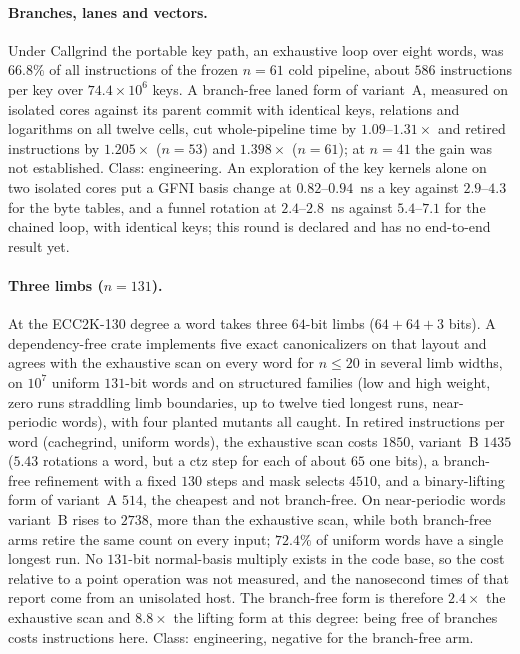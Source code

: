 \paragraph{Branches, lanes and vectors.}
Under Callgrind the portable key path, an exhaustive loop over eight
words, was $66.8\%$ of all instructions of the frozen $n=61$ cold
pipeline, about $586$ instructions per key over $74.4\times10^6$ keys.
A branch-free laned form of variant~A, measured on isolated cores
against its parent commit with identical keys, relations and
logarithms on all twelve cells, cut whole-pipeline time by
$1.09$--$1.31\times$ and retired instructions by $1.205\times$
($n=53$) and $1.398\times$ ($n=61$); at $n=41$ the gain was not
established. Class: engineering.
An exploration of the key kernels alone on two isolated cores put a
GFNI basis change at $0.82$--$0.94$~ns a key against $2.9$--$4.3$ for
the byte tables, and a funnel rotation at $2.4$--$2.8$~ns against
$5.4$--$7.1$ for the chained loop, with identical keys; this round is
declared and has no end-to-end result
yet.

\paragraph{Three limbs ($n=131$).}
At the ECC2K-130 degree a word takes three $64$-bit limbs ($64+64+3$
bits). A dependency-free crate implements five exact canonicalizers on
that layout and agrees with the exhaustive scan on every word for
$n\le20$ in several limb widths, on $10^7$ uniform $131$-bit words and
on structured families (low and high weight, zero runs straddling limb
boundaries, up to twelve tied longest runs, near-periodic words), with
four planted mutants all
caught.
In retired instructions per word (cachegrind, uniform words), the
exhaustive scan costs $1850$, variant~B $1435$ ($5.43$ rotations a
word, but a ctz step for each of about $65$ one bits), a branch-free
refinement with a fixed $130$ steps and mask selects $4510$, and a
binary-lifting form of variant~A $514$, the cheapest and not
branch-free. On near-periodic words variant~B rises to $2738$, more
than the exhaustive scan, while both branch-free arms retire the same
count on every input; $72.4\%$ of uniform words have a single longest
run. No $131$-bit normal-basis multiply exists in the code base, so the
cost relative to a point operation was not measured, and the
nanosecond times of that report come from an unisolated host. The
branch-free form is therefore $2.4\times$ the exhaustive scan and
$8.8\times$ the lifting form at this degree: being free of branches
costs instructions here. Class: engineering, negative for the
branch-free arm.


